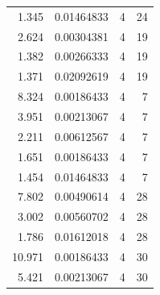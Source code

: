 \documentclass[12pt, letterpaper]{paper}
\begin{document}
\begin{center}
\begin{tabular}{rrrr}
1.345 & 0.01464833 & 4 & 24\\
2.624 & 0.00304381 & 4 & 19\\
1.382 & 0.00266333 & 4 & 19\\
1.371 & 0.02092619 & 4 & 19\\
8.324 & 0.00186433 & 4 & 7\\
3.951 & 0.00213067 & 4 & 7\\
2.211 & 0.00612567 & 4 & 7\\
1.651 & 0.00186433 & 4 & 7\\
1.454 & 0.01464833 & 4 & 7\\
7.802 & 0.00490614 & 4 & 28\\
3.002 & 0.00560702 & 4 & 28\\
1.786 & 0.01612018 & 4 & 28\\
10.971 & 0.00186433 & 4 & 30\\
5.421 & 0.00213067 & 4 & 30\\
\end{tabular}
\end{center}
\end{document}
